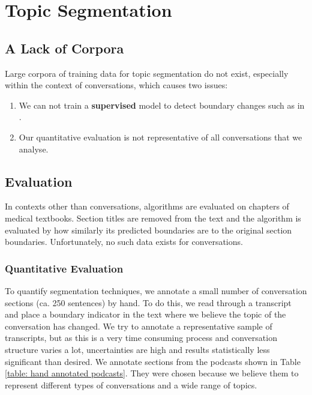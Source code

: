 \section{Topic Segmentation}
\subsection{A Lack of Corpora}
    Large corpora of training data for topic segmentation do not exist, especially within the context of conversations, which causes two issues:
    \begin{enumerate}
        \item We can not train a \textbf{supervised} model to detect boundary changes such as in \cite{joty2013topic}.
        \item Our quantitative evaluation is not representative of all conversations that we analyse.
    \end{enumerate}

\subsection{Evaluation \label{method: segmentation evaluation}} 
    In contexts other than conversations, algorithms are evaluated on chapters of medical textbooks\cite{eisenstein2008bayesian, simon2013leveraging}. Section titles are removed from the text and the algorithm is evaluated by how similarly its predicted boundaries are to the original section boundaries. Unfortunately, no such data exists for conversations.

    \subsubsection{Quantitative Evaluation} 
        To quantify segmentation techniques, we annotate a small number of conversation sections (ca. 250 sentences) by hand. To do this, we read through a transcript and place a boundary indicator in the text where we believe the topic of the conversation has changed. We try to annotate a representative sample of transcripts, but as this is a very time consuming process and conversation structure varies a lot, uncertainties are high and results statistically less significant than desired. We annotate sections from the podcasts shown in Table \ref{table: hand annotated podcasts}. They were chosen because we believe them to represent different types of conversations and a wide range of topics.
        
        \newcolumntype{b}{X}

